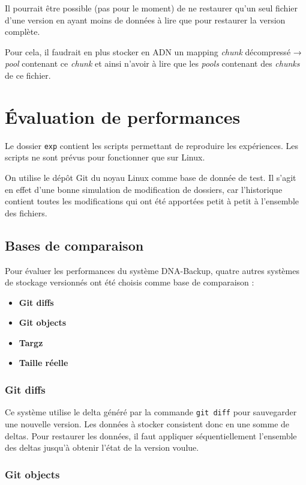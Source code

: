 \documentclass[a4paper]{article}
\begin{document}
Il pourrait être possible (pas pour le moment) de ne restaurer qu'un
seul fichier d'une version en ayant moins de données à lire que pour
restaurer la version complète.

Pour cela, il faudrait en plus stocker en ADN un mapping \emph{chunk}
décompressé → \emph{pool} contenant ce \emph{chunk} et ainsi n'avoir à
lire que les \emph{pools} contenant des \emph{chunks} de ce fichier.

\section{Évaluation de performances}

Le dossier \verb|exp| contient les scripts permettant de reproduire
les expériences. Les scripts ne sont prévus pour fonctionner que sur
Linux.

On utilise le dépôt Git du noyau Linux comme base de donnée de test. Il
s'agit en effet d'une bonne simulation de modification de dossiers, car
l'historique contient toutes les modifications qui ont été apportées
petit à petit à l'ensemble des fichiers.

\subsection{Bases de comparaison}

Pour évaluer les performances du système DNA-Backup, quatre autres
systèmes de stockage versionnés ont été choisis comme base de
comparaison :

\begin{itemize}
\item
  \textbf{Git diffs}
\item
  \textbf{Git objects}
\item
  \textbf{Targz}
\item
  \textbf{Taille réelle}
\end{itemize}

\subsubsection{Git diffs}

Ce système utilise le delta généré par la commande \verb|git diff|
pour sauvegarder une nouvelle version. Les données à stocker consistent
donc en une somme de deltas. Pour restaurer les données, il faut
appliquer séquentiellement l'ensemble des deltas jusqu'à obtenir l'état
de la version voulue.

\subsubsection{Git objects}
\end{document}
